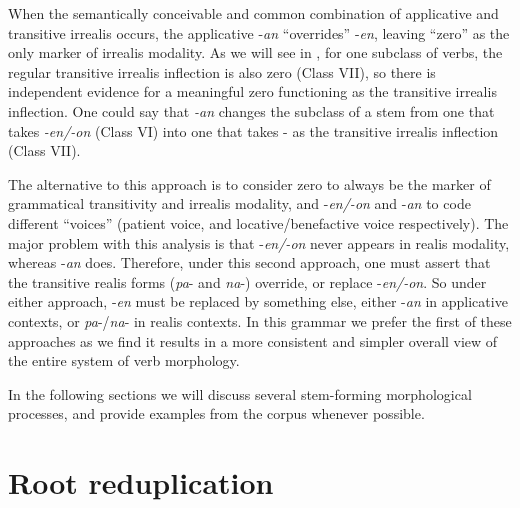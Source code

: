 When the semantically conceivable and common combination of applicative and transitive irrealis occurs, the applicative -\textit{an} “overrides” -\textit{en}, leaving “zero” as the only marker of irrealis modality. As we will see in , for one subclass of verbs, the regular transitive irrealis inflection is also zero (Class VII), so there is independent evidence for a meaningful zero functioning as the transitive irrealis inflection. One could say that \textit{{}-an} changes the subclass of a stem from one that takes \textit{{}-en/-on} (Class VI) into one that takes \emptyset{}- as the transitive irrealis inflection (Class VII).

The alternative to this approach is to consider zero to always be the marker of grammatical transitivity and irrealis modality, and -\textit{en/-on} and \nobreakdash-\textit{an} to code different “voices” (patient voice, and locative/benefactive voice respectively). The major problem with this analysis is that -\textit{en/-on} never appears in realis modality, whereas -\textit{an} does. Therefore, under this second approach, one must assert that the transitive realis forms (\textit{pa}{}- and \textit{na}{}-) override, or replace -\textit{en/-on}. So under either approach, -\textit{en} must be replaced by something else, either -\textit{an} in applicative contexts, or \textit{pa}{}-/\textit{na}{}- in realis contexts. In this grammar we prefer the first of these approaches as we find it results in a more consistent and simpler overall view of the entire system of verb morphology.

In the following sections we will discuss several stem-forming morphological processes, and provide examples from the corpus whenever possible.

\section{Root reduplication}
\label{sec:rootreduplication-verbs}


